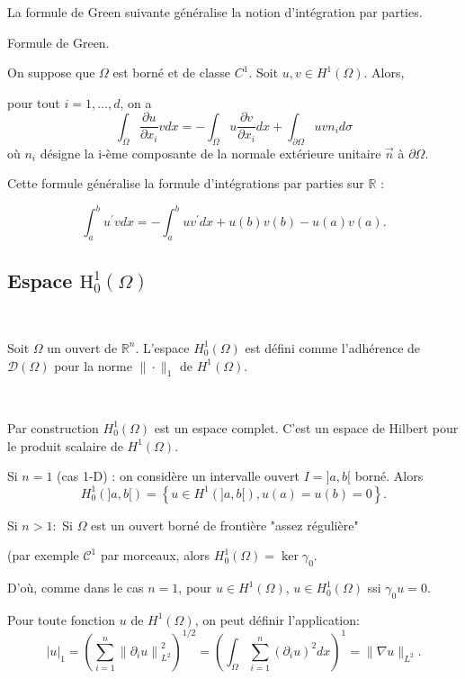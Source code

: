 La formule de Green suivante généralise la notion d'intégration par parties. 
\begin{proposition}Formule de Green.\
	
	 On suppose que $\Omega$ est borné et de classe $C^{1}$. Soit $u, v \in H^{1}(\Omega) .$ Alors, 
	 
	  pour tout $i=1, \ldots, d$,  on a
$$
\int_{\Omega} \frac{\partial u}{\partial x_{i}} v d x=-\int_{\Omega} u \frac{\partial v}{\partial x_{i}} d x+\int_{\partial \Omega} u v n_{i} d \sigma
$$
où $n_{i}$ désigne la i-ème composante de la normale extérieure unitaire $\vec{n}$ à $\partial \Omega$.

Cette formule généralise la formule d'intégrations par parties sur $\mathbb{R}$ :

$$
\int_{a}^b u^\prime v d x=-\int_{a}^b u v^\prime d x+u(b)v(b)-u(a)v(a).
$$
\end{proposition}
\subsection{ Espace $\mathrm{H}_{0}^{1}(\Omega)$}

\begin{definition}\
	
 Soit $\Omega$ un ouvert de $\mathbb{R}^{n}$. L'espace $H_{0}^{1}(\Omega)$ est défini comme l'adhérence de $\mathcal{D}(\Omega)$ pour la norme $\|\cdot\|_{1}$ de $H^{1}(\Omega) .$ 

\end{definition}
\begin{theorem}\
	
Par construction $H_{0}^{1}(\Omega)$ est un espace complet. C'est un espace de Hilbert pour le produit scalaire de $H^1(\Omega)$. 
	
Si $n=1$ (cas 1-D) : on considère un intervalle ouvert $I=] a, b[$ borné. Alors
$$
H_{0}^{1}(] a, b[)=\left\{u \in H^{1}(] a, b[), u(a)=u(b)=0\right\}.
$$

Si $n>1:$ Si $\Omega$ est un ouvert borné de frontière "assez régulière" 

(par exemple $\mathcal{C}^{1}$ par morceaux, alors $H_{0}^{1}(\Omega)=\operatorname{ker} \gamma_{0}$.  

D'où, comme dans le cas $n=1$,  pour $u\in H^{1}(\Omega)$, $u\in H_{0}^{1}(\Omega)$ ssi   $\gamma_0u=0$.

\end{theorem}

 Pour toute fonction $u$ de $H^{1}(\Omega)$,  on peut définir l'application:
$$
|u|_{1}=\left(\sum_{i=1}^{n}\left\|\partial_{i} u\right\|_{L^2}^{2}\right)^{1 / 2}=\left(\int_{\Omega} \sum_{i=1}^{n}\left(\partial_{i} u\right)^{2} d x\right)^{1 }=\|\nabla u\|_{L^2} .
$$



